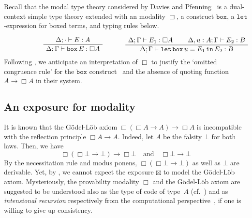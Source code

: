 \documentclass[a4paper,UKenglish,numberwithinsect,cleveref,thm-restate]{lipics-v2021}
\numberwithin{equation}{section}
\theoremstyle{plain}
\begin{document}
\begin{remark}\label{re:S4-modality}
  Recall that the modal type theory considered by Davies and Pfenning~\cite{Davies2001b} is a dual-context simple type theory extended with an \SFour modality $\Box$, a construct $\mathtt{box}$, a $\mathtt{let}$-expression for boxed terms, and typing rules below.
\[
\begin{minipage}{.47\linewidth}
  \begin{prooftree}
    \AxiomC{$\Delta; \cdot \vdash E : A$}
    \UnaryInfC{$\Delta; \Gamma \vdash \mathtt{box}\,E:\Box A$}
  \end{prooftree}
\end{minipage}%
\begin{minipage}{0.47\linewidth}
  \begin{prooftree}
    \AxiomC{$\Delta; \Gamma \vdash E_1 : \Box A$}
    \AxiomC{$\Delta, u : A; \Gamma \vdash E_2 : B$}
  \BinaryInfC{$\Delta; \Gamma \vdash \mathtt{let}\,\mathtt{box}\, u = E_1\, \mathtt{in}\,E_2 : B$}
  \end{prooftree}
\end{minipage}
\]
Following , we anticipate an interpretation of $\Box$ to justify the `omitted congruence rule' for the $\mathtt{box}$ construct~\cite[Section~2.5]{Davies2001b} and the absence of quoting function $A \to \Box A$ in their system.
\end{remark}

\subsection{An exposure for \texorpdfstring{\GL}{GL} modality}
It is known that the Gödel-Löb axiom $\Box(\Box A \to A) \to \Box A$ is incompatible with the reflection principle $\Box A \to A$.
Indeed, let $A$ be the falsity $\bot$ for both laws. Then, we have
\[
  \Box(\Box \bot \to \bot) \to \Box \bot
  \quad\text{and}\quad
  \Box \bot \to \bot
\]
By the necessitation rule and modus ponens, $\Box (\Box \bot \to \bot)$ as well as $\bot$ are derivable.
Yet, by , we cannot expect the exposure $\boxtimes$ to model the Gödel-Löb axiom.
Mysteriously, the provability modality $\Box$ and the Gödel-Löb axiom are suggested to be understood also as the type of code of type~$A$ (cf.~) and as \emph{intensional recursion} respectively from the computational perspective~\cite{Kavvos2017b}, if one is willing to give up consistency.
\end{document}

